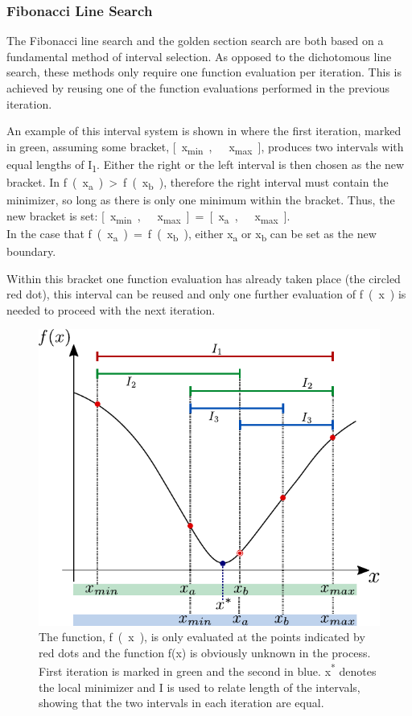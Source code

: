\subsubsection{Fibonacci Line Search}
The Fibonacci line search and the golden section search are both based on a fundamental method of interval selection. As opposed to the dichotomous line search, these methods only require one function evaluation per iteration. This is achieved by reusing one of the function evaluations performed in the previous iteration.

An example of this interval system is shown in  where the first iteration, marked in green, assuming some bracket, \si{[x_{min},\ x_{max}]}, produces two intervals with equal lengths of \si{I_1}. Either the right or the left interval is then chosen as the new bracket. In  \si{f(x_a) > f(x_b)}, therefore the right interval must contain the minimizer, so long as there is only one minimum within the bracket. Thus, the new bracket is set: \si{[x_{min},\ x_{max}] = \si{[x_{a},\ x_{max}]}}.\\
In the case that \si{f(x_a) = f(x_b)}, either \si{x_a} or \si{x_b} can be set as the new boundary.

Within this bracket one function evaluation has already taken place (the circled red dot), this interval can be reused and only one further evaluation of \si{f(x)} is needed to proceed with the next iteration.

\begin{figure}[H] 
	\centering
	\includegraphics[width=.5\textwidth]{figures/fibonacciIntervalSystem}
	\caption{The function, \si{f(x)}, is only evaluated at the points indicated by red dots and the function f(x) is obviously unknown in the process. First iteration is marked in green and the second in blue. \si{x^*} denotes the local minimizer and \si{I} is used to relate length of the intervals, showing that the two intervals in each iteration are equal.}
	\label{fibonacciIntervalSystem}
\end{figure}

